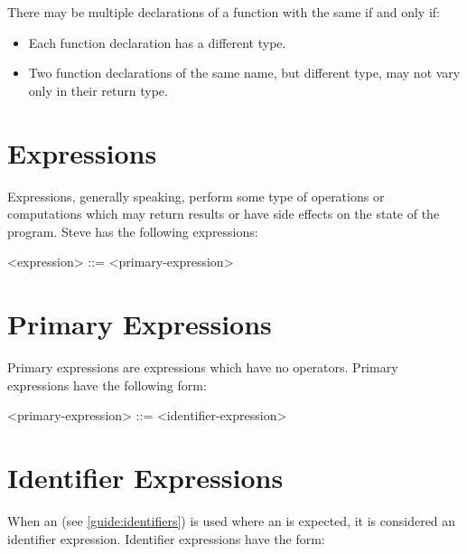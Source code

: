 There may be multiple declarations of a function with the same  if and only if:

\begin{itemize}
\item Each function declaration has a different type.
\item Two function declarations of the same name, but different type, may not vary only in their return type.
\end{itemize} 

\section{Expressions} \label{guide:expr}

Expressions, generally speaking, perform some type of operations or computations which may return results or have side effects on the state of the program. Steve has the following expressions:

\begin{minip}
\begin{grammar}
<expression> ::=
<primary-expression>
\end{grammar}
\end{minip}

\section{Primary Expressions} \label{guide:primary_expr}

Primary expressions are expressions which have no operators. Primary expressions have the following form:

\begin{minip}
\begin{grammar}
<primary-expression> ::= 
<identifier-expression>
\end{grammar}
\end{minip}

\section{Identifier Expressions} \label{guide:id_expr}

When an  (see \ref{guide:identifiers}) is used where an  is expected, it is considered an identifier expression. Identifier expressions have the form:

